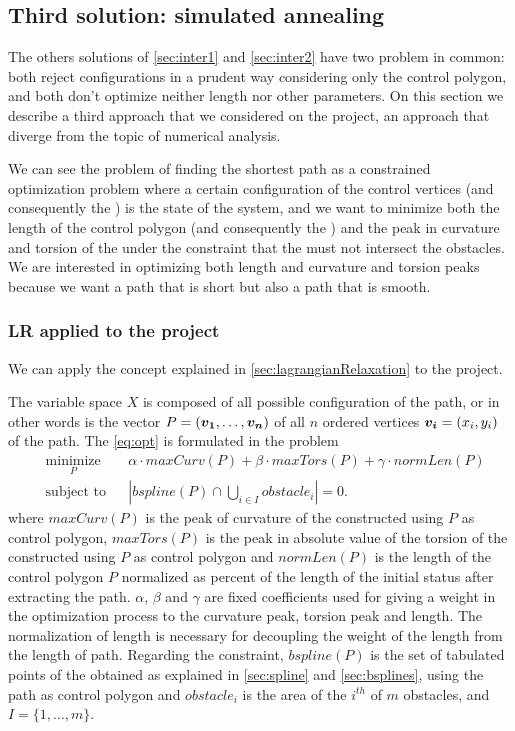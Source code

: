 \documentclass[dissertation.tex]{subfiles}
\begin{document}
\subsection{Third solution: simulated annealing}\label{sec:inter3}
The others solutions of \cref{sec:inter1} and \cref{sec:inter2} have two
problem in common: both reject configurations in a prudent way
considering only the control polygon, and both don't optimize neither
length nor other parameters. On this section we describe a third
approach that we considered on the project, an approach that diverge
from the topic of numerical analysis.

We can see the problem of finding the shortest path as a constrained
optimization problem where a certain configuration of the control
vertices (and
consequently the \bs) is the state of the system, and we want to
minimize both the length of the control polygon (and consequently the
\bs) and the peak in curvature and torsion of the \bs under
the constraint that the \bs must not intersect the obstacles. We
are interested in optimizing both length and curvature and torsion
peaks because we want a path that is short but also a path that is
smooth.

\subsubsection{\acf{LR} applied to the project}
We can apply the concept explained in \cref{sec:lagrangianRelaxation}
to the project.

The variable space $X$ is composed of all possible
configuration of the path, or in other words is the vector
$P=(\boldsymbol{v_1},\dots,\boldsymbol{v_n})$ of all $n$ ordered
vertices $\boldsymbol{v_i}=(x_i,y_i)$ of the
path. The \cref{eq:opt} is formulated in the problem
\begin{equation*}
  \begin{aligned}
    & \underset{P}{\text{minimize}}
    & & \alpha\cdot maxCurv(P)+\beta\cdot
    maxTors(P)+\gamma\cdot normLen(P) \\
    & \text{subject to}
    & & \left|bspline(P)\cap \bigcup_{i\in I}obstacle_i\right| = 0.
  \end{aligned}
\end{equation*}
where $maxCurv(P)$ is the peak of curvature of the \bs
constructed using $P$ as control polygon,
$maxTors(P)$ is the peak in absolute value of the torsion of
the \bs constructed using $P$ as control polygon and
$normLen(P)$ is the length of the control polygon
$P$ normalized as percent of the length of the initial status
after extracting the path. $\alpha$, $\beta$ and $\gamma$ are fixed
coefficients used for giving a weight in the optimization process to
the curvature peak, torsion peak and length. The normalization of
length is necessary for decoupling the weight of the length from the
length of path. Regarding the constraint, $bspline(P)$
is the set of tabulated points of the \emph{\bs} obtained as
explained in
\cref{sec:spline} and \cref{sec:bsplines}, using the path as
control polygon and
$obstacle_i$ is the area of the $i^{th}$ of $m$ obstacles, and
$I=\{1,\dots,m\}$.
\end{document}
